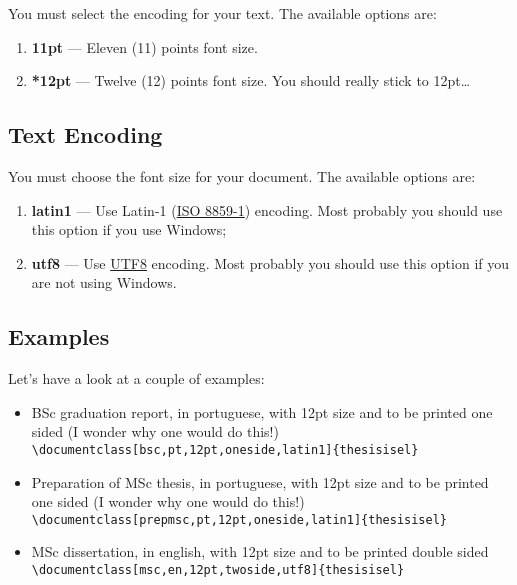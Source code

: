 You must select the encoding for your text. The available options are:
\begin{enumerate}
	\item \textbf{11pt} --- Eleven (11) points font size.
	\item \textbf{*12pt} --- Twelve (12) points font size. You should really stick to 12pt\ldots
\end{enumerate}

\subsection{Text Encoding} %
\label{ssec:text_encoding}

You must choose the font size for your document. The available options are:
\begin{enumerate}
	\item \textbf{latin1} --- Use Latin-1 (\href{http://en.wikipedia.org/wiki/ISO/IEC_8859-1}{ISO 8859-1}) encoding.  Most probably you should use this option if you use Windows;
	\item \textbf{utf8} --- Use \href{http://en.wikipedia.org/wiki/UTF-8}{UTF8} encoding.    Most probably you should use this option if you are not using Windows.
\end{enumerate}

\subsection{Examples} %
\label{ssec:examples}

Let's have a look at a couple of examples:

\begin{itemize}
	\item BSc graduation report, in portuguese, with 12pt size and to be printed one sided (I wonder why one would do this!)\\
	\verb!\documentclass[bsc,pt,12pt,oneside,latin1]{thesisisel}!
	\item Preparation of MSc thesis, in portuguese, with 12pt size and to be printed one sided (I wonder why one would do this!)\\
	\verb!\documentclass[prepmsc,pt,12pt,oneside,latin1]{thesisisel}!
	\item MSc dissertation, in english, with 12pt size and to be printed double sided\\
	\verb!\documentclass[msc,en,12pt,twoside,utf8]{thesisisel}!
\end{itemize}

